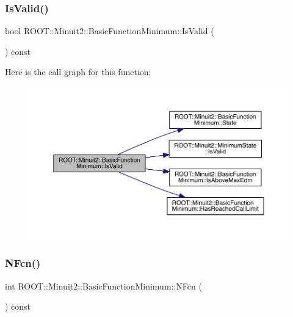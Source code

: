 \subsubsection{\texorpdfstring{IsValid()}{IsValid()}\hspace{0.1cm}{\footnotesize\ttfamily [2/2]}}
{\footnotesize\ttfamily bool R\+O\+O\+T\+::\+Minuit2\+::\+Basic\+Function\+Minimum\+::\+Is\+Valid (\begin{DoxyParamCaption}{ }\end{DoxyParamCaption}) const\hspace{0.3cm}{\ttfamily [inline]}}

Here is the call graph for this function\+:
\nopagebreak
\begin{figure}[H]
\begin{center}
\leavevmode
\includegraphics[width=350pt]{de/d25/classROOT_1_1Minuit2_1_1BasicFunctionMinimum_a644f34dabb94b0b5bdc8f7b8bfa7ae4b_cgraph}
\end{center}
\end{figure}
\mbox{\label{classROOT_1_1Minuit2_1_1BasicFunctionMinimum_a1b73ebb29cc319f09fdd5a4408e703ba}} 
\subsubsection{\texorpdfstring{NFcn()}{NFcn()}\hspace{0.1cm}{\footnotesize\ttfamily [1/2]}}
{\footnotesize\ttfamily int R\+O\+O\+T\+::\+Minuit2\+::\+Basic\+Function\+Minimum\+::\+N\+Fcn (\begin{DoxyParamCaption}{ }\end{DoxyParamCaption}) const\hspace{0.3cm}{\ttfamily [inline]}}


